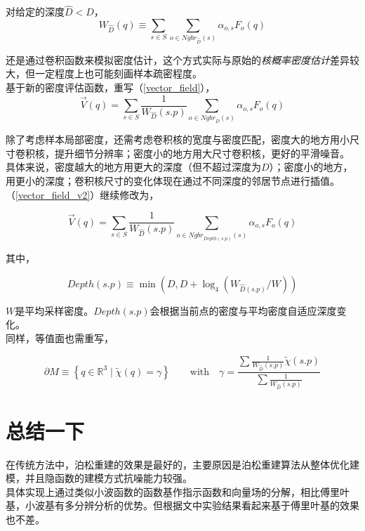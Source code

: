 	对给定的深度$\hat{D} < D$，
	$$
		W_{\hat{D}}(q) \equiv \sum_{s \in S} \sum_{o \in {Ngbr}_{\hat{D}}(s)} \alpha_{o,s}F_o(q)
	$$

	还是通过卷积函数来模拟密度估计，这个方式实际与原始的\textit{核概率密度估计}差异较大，但一定程度上也可能刻画样本疏密程度。\\

	基于新的密度评估函数，重写（\ref{vector_field}），
	\begin{equation}
		\overrightarrow{V}(q) = \sum_{s\in S}\frac{1}{W_{\hat{D}}(s.p)} \sum_{o \in {Ngbr}_D(s)} \alpha_{o,s}F_o(q) \label{vector_field_v2}
	\end{equation}

	除了考虑样本局部密度，还需考虑卷积核的宽度与密度匹配，密度大的地方用小尺寸卷积核，提升细节分辨率；密度小的地方用大尺寸卷积核，更好的平滑噪音。\\

	具体来说，密度越大的地方用更大的深度（但不超过深度为$D$）；密度小的地方，用更小的深度；卷积核尺寸的变化体现在通过不同深度的邻居节点进行插值。\\

	（\ref{vector_field_v2}）继续修改为，

	\begin{equation}
		\overrightarrow{V}(q) = \sum_{s\in S}\frac{1}{W_{\hat{D}}(s.p)} \sum_{o \in {Ngbr}_{Depth(s.p)}(s)} \alpha_{o,s}F_o(q) \label{vector_field_v3}
	\end{equation}

	其中，

	$$
		{Depth}(s.p) \equiv \min\left(D, D + \log_4\left(W_{\hat{D}(s.p)}/W\right)\right)
	$$

	$W$是平均采样密度。${Depth}(s.p)$会根据当前点的密度与平均密度自适应深度变化。\\

	同样，等值面也需重写，

	$$
		\partial M \equiv \left\lbrace q \in \mathbb{R}^3 \mid \tilde{\chi}(q) = \gamma \right\rbrace
		\qquad \text{with} \quad  \gamma = 
				\frac{
					\sum \frac{1}{ W_{\hat{D}}(s.p)} \tilde{\chi}(s.p)
				}
				{
					\sum \frac{1}{ W_{\hat{D}}(s.p)}
				}
	$$

\section{总结一下}
	在传统方法中，泊松重建的效果是最好的，主要原因是泊松重建算法从整体优化建模，并且隐函数的建模方式抗噪能力较强。\\

	具体实现上通过类似小波函数的函数基作指示函数和向量场的分解，相比傅里叶基，小波基有多分辨分析的优势。但根据文中实验结果看起来基于傅里叶基的效果也不差。